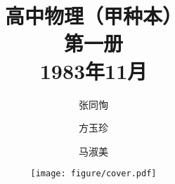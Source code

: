 \documentclass[b5paper, openany]{ctexbook}
\theoremstyle{plain}
\begin{document}














\title{高中物理（甲种本）\\
第一册\\ 1983年11月}



\author{张同恂\and 方玉珍\and 马淑美}
\date{\texttt{[image: figure/cover.pdf]}}

\maketitle

\tableofcontents


\frontmatter



\mainmatter
















\backmatter




\begin{appendix}
	
\end{appendix}
\end{document}
